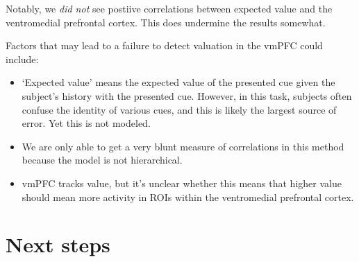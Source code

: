 \documentclass[]{article}
\providecommand{\tightlist}{%
  \setlength{\itemsep}{0pt}\setlength{\parskip}{0pt}}
\begin{document}
Notably, we \emph{did not} see postiive correlations between expected
value and the ventromedial prefrontal cortex. This does undermine the
results somewhat.

Factors that may lead to a failure to detect valuation in the vmPFC
could include:

\begin{itemize}
\tightlist
\item
  `Expected value' means the expected value of the presented cue given
  the subject's history with the presented cue. However, in this task,
  subjects often confuse the identity of various cues, and this is
  likely the largest source of error. Yet this is not modeled.
\item
  We are only able to get a very blunt measure of correlations in this
  method because the model is not hierarchical.
\item
  vmPFC tracks value, but it's unclear whether this means that higher
  value should mean more activity in ROIs within the ventromedial
  prefrontal cortex.
\end{itemize}

\section{Next steps}\label{next-steps}
\end{document}
